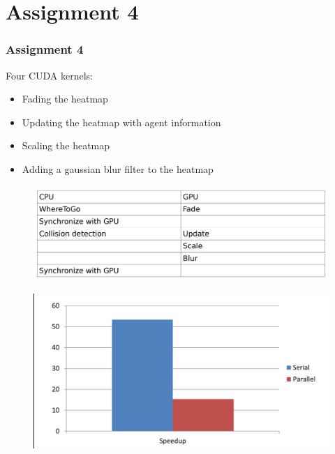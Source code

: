\documentclass{beamer}
\begin{document}
\section{Assignment 4}
\begin{frame}
	\frametitle{Assignment 4}
	Four CUDA kernels:
	\begin{itemize}
	\item
	Fading the heatmap 
	\item
	Updating the heatmap with agent information
	\item
	Scaling the heatmap
	\item
	Adding a gaussian blur filter to the heatmap
	\end{itemize}
\end{frame}

\begin{frame}
	\begin{figure}[h!]
	\includegraphics[width=\textwidth]{lab4graph1.png}
	\end{figure}
\end{frame}

\begin{frame}
	\begin{figure}[h!]
	\includegraphics[width=\textwidth]{lab4graph2.png}
	\end{figure}
\end{frame}
\end{document}
